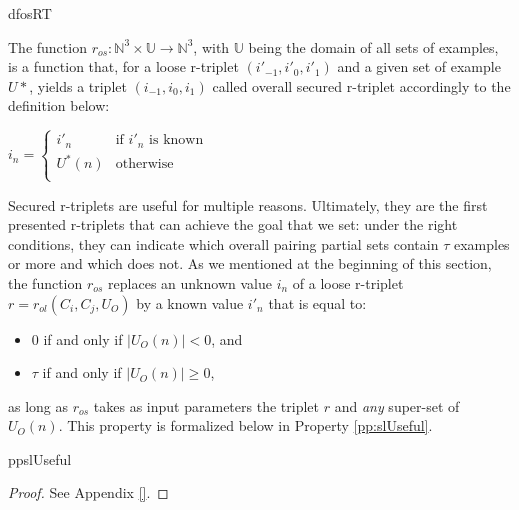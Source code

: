 \begin{restatable}{df}{osRT}\label{def:osRTriplet}

The function $r_{os}: \mathbb{N}^{3} \times \mathbb{U} \rightarrow  \mathbb{N}^{3}$, with $\mathbb{U}$ being the domain of all sets of examples, is a function that, for a loose r-triplet $(i'_{-1}, i'_{0}, i'_{1})$ and a given set of example $U*$, yields a triplet $(i_{-1},i_{0},i_{1})$ called overall secured r-triplet accordingly to the definition below:

\begin{center}
    $i_{n} = \left\{
	\begin{array}{lll}
		i'_{n} & \mbox{if } i'_{n} \mbox{ is known }  \\
		U^{*}(n) & \mbox{otherwise } \\
	\end{array}
\right.$
\end{center}

\end{restatable}

Secured r-triplets are useful for multiple reasons. Ultimately, they are the first presented r-triplets that can achieve the goal that we set: under the right conditions, they can indicate which overall pairing partial sets contain $\tau$ examples or more and which does not. As we mentioned at the beginning of this section, the function $r_{os}$ replaces an unknown value $i_{n}$ of a loose r-triplet $r = r_{ol}(C_{i}, C_{j}, U_{O})$ by a known value $i'_{n}$ that is equal to:

\begin{itemize}
    \item 0 if and only if $|U_{O}(n)| < 0$, and
    \item $\tau$ if and only if $|U_{O}(n)| \geq 0$,
\end{itemize}

as long as $r_{os}$ takes as input parameters the triplet $r$ and \emph{any} super-set of $U_{O}(n)$. This property is formalized below in Property \ref{pp:slUseful}.

\begin{restatable}{pp}{slUseful}
\label{pp:slUseful}

\end{restatable}

\begin{proof}
See Appendix \ref{}.
\end{proof}


